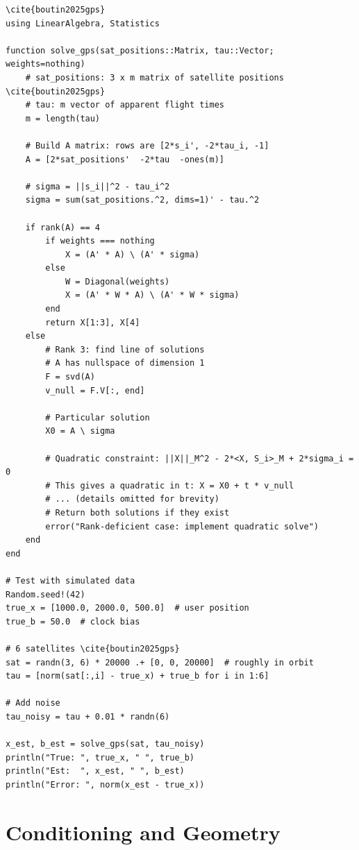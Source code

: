 \begin{lstlisting}[style=julia,caption=GPS solver with noise] \cite{boutin2025gps}
using LinearAlgebra, Statistics

function solve_gps(sat_positions::Matrix, tau::Vector; weights=nothing)
    # sat_positions: 3 x m matrix of satellite positions \cite{boutin2025gps}
    # tau: m vector of apparent flight times
    m = length(tau)
    
    # Build A matrix: rows are [2*s_i', -2*tau_i, -1]
    A = [2*sat_positions'  -2*tau  -ones(m)]
    
    # sigma = ||s_i||^2 - tau_i^2
    sigma = sum(sat_positions.^2, dims=1)' - tau.^2
    
    if rank(A) == 4
        if weights === nothing
            X = (A' * A) \ (A' * sigma)
        else
            W = Diagonal(weights)
            X = (A' * W * A) \ (A' * W * sigma)
        end
        return X[1:3], X[4]
    else
        # Rank 3: find line of solutions
        # A has nullspace of dimension 1
        F = svd(A)
        v_null = F.V[:, end]
        
        # Particular solution
        X0 = A \ sigma
        
        # Quadratic constraint: ||X||_M^2 - 2*<X, S_i>_M + 2*sigma_i = 0
        # This gives a quadratic in t: X = X0 + t * v_null
        # ... (details omitted for brevity)
        # Return both solutions if they exist
        error("Rank-deficient case: implement quadratic solve")
    end
end

# Test with simulated data
Random.seed!(42)
true_x = [1000.0, 2000.0, 500.0]  # user position
true_b = 50.0  # clock bias

# 6 satellites \cite{boutin2025gps}
sat = randn(3, 6) * 20000 .+ [0, 0, 20000]  # roughly in orbit
tau = [norm(sat[:,i] - true_x) + true_b for i in 1:6]

# Add noise
tau_noisy = tau + 0.01 * randn(6)

x_est, b_est = solve_gps(sat, tau_noisy)
println("True: ", true_x, " ", true_b)
println("Est:  ", x_est, " ", b_est)
println("Error: ", norm(x_est - true_x))
\end{lstlisting}

\section{Conditioning and Geometry}
\label{sec:gps:conditioning}

